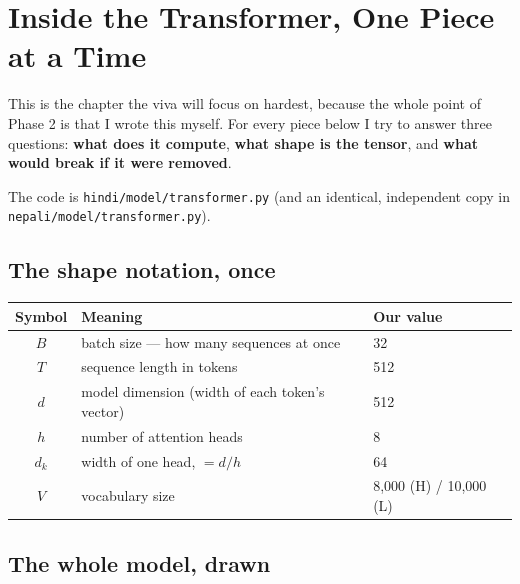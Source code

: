 \documentclass[11pt]{report}
\newcommand{\p}[1]{\texttt{#1}}
\begin{document}
\chapter{Inside the Transformer, One Piece at a Time}

This is the chapter the viva will focus on hardest, because the whole point of
Phase 2 is that I wrote this myself. For every piece below I try to answer three
questions: \textbf{what does it compute}, \textbf{what shape is the tensor}, and
\textbf{what would break if it were removed}.

The code is \p{hindi/model/transformer.py} (and an identical, independent copy in
\p{nepali/model/transformer.py}).

\section{The shape notation, once}

\begin{center}
\begin{tabular}{cll}
\toprule
Symbol & Meaning & Our value \\
\midrule
$B$ & batch size --- how many sequences at once & 32 \\
$T$ & sequence length in tokens & 512 \\
$d$ & model dimension (width of each token's vector) & 512 \\
$h$ & number of attention heads & 8 \\
$d_k$ & width of one head, $= d/h$ & 64 \\
$V$ & vocabulary size & 8,000 (H) / 10,000 (L) \\
\bottomrule
\end{tabular}
\end{center}

\section{The whole model, drawn}
\end{document}
